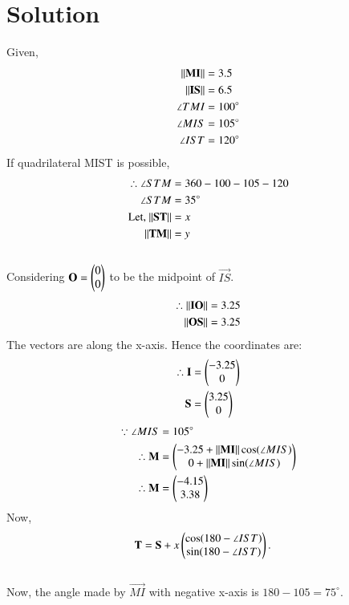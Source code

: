 \documentclass[journal,12pt,twocolumn]{IEEEtran}
\begin{document}
\section{Solution}
Given,
\begin{align}
    \lVert\mathbf{MI}\rVert &= 3.5\\
    \lVert\mathbf{IS}\rVert &= 6.5\\
    \angle{TMI} &= 100^{\circ}\\
    \angle{MIS} &= 105^{\circ}\\
    \angle{IST} &= 120^{\circ}\\
\end{align}
If quadrilateral MIST is possible,
\begin{align}
    \therefore \angle{STM} &= 360 - 100 - 105 - 120\\
    \angle{STM} &= 35^{\circ}\\
    \text{Let, } \lVert\mathbf{ST}\rVert &= x\\
    \lVert\mathbf{TM}\rVert &= y
\end{align}\\
Considering $\mathbf{O} = \begin{pmatrix}0\\0\end{pmatrix}$ to be the midpoint of $\vec{IS}$.
\begin{align}
    \therefore\lVert\mathbf{IO}\rVert &= 3.25\\
    \lVert\mathbf{OS}\rVert &= 3.25\\
\end{align}
The vectors are along the x-axis. Hence the coordinates are:
\begin{align}
    \therefore \mathbf{I} &= \begin{pmatrix}-3.25\\0\end{pmatrix}\\
    \mathbf{S} &= \begin{pmatrix}3.25\\0\end{pmatrix}
\end{align}
\begin{align}
    \because \angle MIS &= 105^{\circ}\\
    \therefore \mathbf{M} &= \begin{pmatrix}-3.25 + \lVert{\mathbf{MI}}\rVert\cos({\angle{MIS}})\\0 + \lVert\mathbf{MI}\rVert\sin({\angle{MIS}})\end{pmatrix}\\
    \therefore \mathbf{M} &= \begin{pmatrix}-4.15\\3.38\end{pmatrix}
\end{align}
Now,
\begin{align}
\mathbf{T} &= \mathbf{S} + x\begin{pmatrix}\cos(180-\angle IST)\\\sin(180-\angle IST)\end{pmatrix}.
\end{align}
\\Now, the angle made by $\vec{MI}$ with negative x-axis is $180-105 = 75^{\circ}$. \\
\end{document}
